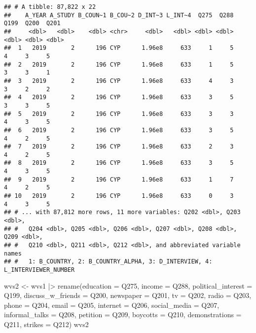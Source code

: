 \documentclass[
]{article}
\newenvironment{Shaded}{\begin{snugshade}}{\end{snugshade}}
\newcommand{\AttributeTok}[1]{\textcolor[rgb]{0.77,0.63,0.00}{#1}}
\newcommand{\FunctionTok}[1]{\textcolor[rgb]{0.00,0.00,0.00}{#1}}
\newcommand{\NormalTok}[1]{#1}
\newcommand{\OtherTok}[1]{\textcolor[rgb]{0.56,0.35,0.01}{#1}}
\newcommand{\SpecialCharTok}[1]{\textcolor[rgb]{0.00,0.00,0.00}{#1}}
\begin{document}
\begin{verbatim}
## # A tibble: 87,822 x 22
##    A_YEAR A_STUDY B_COUN~1 B_COU~2 D_INT~3 L_INT~4  Q275  Q288  Q199  Q200  Q201
##     <dbl>   <dbl>    <dbl> <chr>     <dbl>   <dbl> <dbl> <dbl> <dbl> <dbl> <dbl>
##  1   2019       2      196 CYP      1.96e8     633     1     5     4     3     5
##  2   2019       2      196 CYP      1.96e8     633     1     5     3     3     1
##  3   2019       2      196 CYP      1.96e8     633     4     3     3     2     2
##  4   2019       2      196 CYP      1.96e8     633     3     5     3     3     5
##  5   2019       2      196 CYP      1.96e8     633     3     3     4     3     5
##  6   2019       2      196 CYP      1.96e8     633     3     5     4     2     5
##  7   2019       2      196 CYP      1.96e8     633     2     3     4     2     5
##  8   2019       2      196 CYP      1.96e8     633     3     5     4     3     5
##  9   2019       2      196 CYP      1.96e8     633     1     7     4     2     5
## 10   2019       2      196 CYP      1.96e8     633     0     3     4     3     5
## # ... with 87,812 more rows, 11 more variables: Q202 <dbl>, Q203 <dbl>,
## #   Q204 <dbl>, Q205 <dbl>, Q206 <dbl>, Q207 <dbl>, Q208 <dbl>, Q209 <dbl>,
## #   Q210 <dbl>, Q211 <dbl>, Q212 <dbl>, and abbreviated variable names
## #   1: B_COUNTRY, 2: B_COUNTRY_ALPHA, 3: D_INTERVIEW, 4: L_INTERVIEWER_NUMBER
\end{verbatim}

\begin{Shaded}
\begin{Highlighting}[]
\NormalTok{wvs2 }\OtherTok{\textless{}{-}}\NormalTok{ wvs1 }\SpecialCharTok{|\textgreater{}}
  \FunctionTok{rename}\NormalTok{(}\AttributeTok{education =}\NormalTok{ Q275,}
         \AttributeTok{income =}\NormalTok{ Q288,}
         \AttributeTok{political\_interest =}\NormalTok{ Q199,}
         \AttributeTok{discuss\_w\_friends =}\NormalTok{ Q200,}
         \AttributeTok{newspaper =}\NormalTok{ Q201,}
         \AttributeTok{tv =}\NormalTok{ Q202,}
         \AttributeTok{radio =}\NormalTok{ Q203,}
         \AttributeTok{phone =}\NormalTok{ Q204,}
         \AttributeTok{email =}\NormalTok{ Q205,}
         \AttributeTok{internet =}\NormalTok{ Q206,}
         \AttributeTok{social\_media =}\NormalTok{ Q207,}
         \AttributeTok{informal\_talks =}\NormalTok{ Q208,}
         \AttributeTok{petition =}\NormalTok{ Q209,}
         \AttributeTok{boycotts =}\NormalTok{ Q210,}
         \AttributeTok{demonstrations =}\NormalTok{ Q211,}
         \AttributeTok{strikes =}\NormalTok{ Q212)}
\NormalTok{wvs2}
\end{Highlighting}
\end{Shaded}
\end{document}

